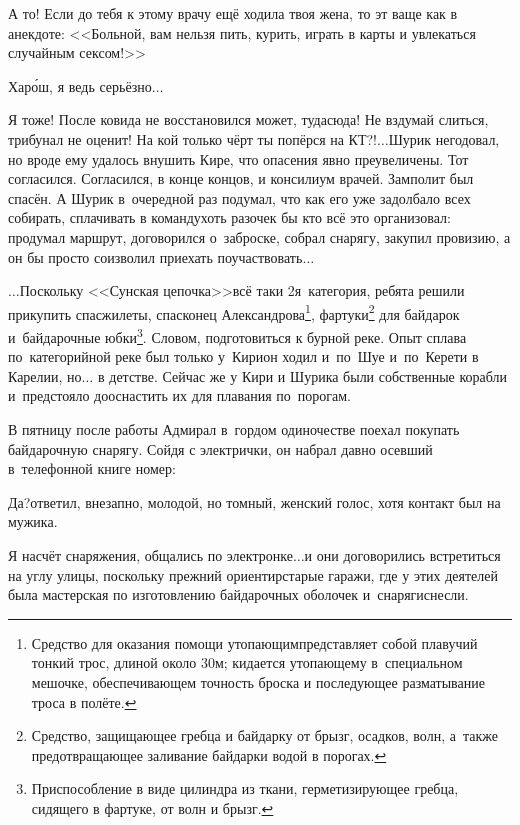 \diagdash А то! Если до тебя к этому врачу ещё ходила твоя жена, то эт ваще как в анекдоте: <<Больной, вам нельзя пить, курить, играть в карты и увлекаться случайным сексом!>>

\diagdash Хар\'{о}ш, я ведь серьёзно$\ldots$

\diagdash Я тоже! После ковида не восстановился может, туда\sdash сюда! Не вздумай слиться, трибунал не оценит! На кой только чёрт ты попёрся на КТ?!$\ldots$\mdash Шурик негодовал, но вроде ему удалось внушить Кире, что опасения явно преувеличены. Тот согласился. Согласился, в конце концов, и консилиум врачей. Замполит был спасён. А Шурик в~очередной раз подумал, что как его уже задолбало всех собирать, сплачивать в команду\mdash хоть разочек бы кто всё это организовал: продумал маршрут, договорился о~заброске, собрал снарягу, закупил провизию, а он бы просто соизволил приехать поучаствовать$\ldots$

\vspace{0.9cm}
\renewcommand*{\thefootnote}{\arabic{footnote}}
$\ldots$Поскольку <<Сунская цепочка>>\mdash всё таки 2\sdash я~категория, ребята решили прикупить спасжилеты, спасконец Александрова\footnote[1]{Средство для оказания помощи утопающим\mdash представляет собой плавучий тонкий трос, длиной около 30\thinspace м; кидается утопающему в~специальном мешочке, обеспечивающем точность броска и последующее разматывание троса в полёте.}, фартуки\footnote[2]{Средство, защищающее гребца и байдарку от брызг, осадков, волн, а~также предотвращающее заливание байдарки водой в порогах.} для байдарок и~байдарочные юбки\footnote[3]{Приспособление в виде цилиндра из ткани, герметизирующее гребца, сидящего в фартуке, от волн и брызг.}. Словом, подготовиться к бурной реке. Опыт сплава по~категорийной реке был только у~Кири\mdash он ходил и~по~Шуе и~по~Керети в Карелии, но$\ldots$ в детстве. Сейчас же у Кири и Шурика были собственные корабли и~предстояло дооснастить их для плавания по~порогам. 

В пятницу после работы Адмирал в~гордом одиночестве поехал покупать байдарочную снарягу. Сойдя с электрички, он набрал давно осевший в~телефонной книге номер:

\diagdash Да?\mdash ответил, внезапно, молодой, но томный, женский голос, хотя контакт был на мужика.

\diagdash Я насчёт снаряжения, общались по электронке$\ldots$\mdash и они договорились встретиться на углу улицы, поскольку прежний ориентир\mdash старые гаражи, где у этих деятелей была мастерская по изготовлению байдарочных оболочек и~снаряги\mdash снесли.

